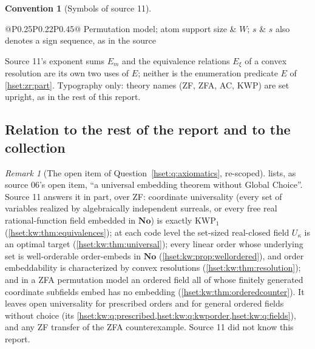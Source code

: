 \documentclass[11pt,letterpaper]{article}
\theoremstyle{definition}
\newtheorem{convention}[convention]{Convention}\aliascntresetthe{convention}
\theoremstyle{remark}
\newtheorem{remark}[remark]{Remark}\aliascntresetthe{remark}
\newcommand{\No}{\mathbf{No}}
\newcommand{\KWP}{\mathrm{KWP}}
\begin{document}
\begin{convention}[Symbols of source 11]
\begin{center}
\begin{longtable}{@{}P{0.25\textwidth}P{0.22\textwidth}P{0.45\textwidth}@{}}
Permutation model; atom support size & $W$; $s$ & $s$ also denotes a sign sequence, as in the source\\
\bottomrule
\end{longtable}
\end{center}
Source 11's exponent sums $E_m$ and the equivalence relations $E_\xi$ of a
convex resolution are its own two uses of $E$; neither is the enumeration
predicate $E$ of \cref{hset:zr:part}. Typography only: theory names (ZF, ZFA,
AC, $\KWP$) are set upright, as in the rest of this report.
\end{convention}

\subsection{Relation to the rest of the report and to the collection}
\label{hset:kw:sub:relation}

\begin{remark}[The open item of Question~\ref{hset:q:axiomatics}, re-scoped]
\label{hset:kw:rem:question}
 lists, as source 06's open item, ``a universal
embedding theorem without Global Choice''. Source 11 answers it in part, over ZF:
coordinate universality (every set of variables realized by algebraically
independent surreals, or every free real rational-function field embedded in
$\No$) is exactly $\KWP_1$ (\cref{hset:kw:thm:equivalences}); at each code level
the set-sized real-closed field $U_\kappa$ is an optimal target
(\cref{hset:kw:thm:universal}); every linear order whose underlying set is
well-orderable order-embeds in $\No$ (\cref{hset:kw:prop:wellordered}), and
order embeddability is characterized by convex resolutions
(\cref{hset:kw:thm:resolution}); and in a ZFA permutation model an ordered field
all of whose finitely generated coordinate subfields embed has no embedding
(\cref{hset:kw:thm:orderedcounter}). It leaves open universality for prescribed
orders and for general ordered fields without choice (its
\cref{hset:kw:q:prescribed,hset:kw:q:kwporder,hset:kw:q:fields}), and any ZF
transfer of the ZFA counterexample. Source 11 did not know this report.
\end{remark}
\end{document}
